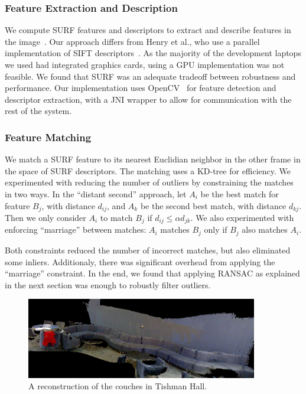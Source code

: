 \documentclass[letterpaper, 10pt, conference]{ieeeconf}
\begin{document}
\subsubsection{Feature Extraction and Description}
We compute SURF features and descriptors
to extract and describe features in the image~\cite{Bay06surf}. Our approach differs
from Henry et al., who use a parallel implementation of SIFT descriptors~\cite{SIFTGPU}.
As the majority of the development laptops we used had integrated graphics cards, using
a GPU implementation was not feasible. We found that SURF was an adequate tradeoff
between robustness and performance. Our implementation uses OpenCV~\cite{opencv_library}
for feature detection and descriptor extraction, with a JNI wrapper to allow for
communication with the rest of the system.

\subsubsection{Feature Matching}
We match a SURF feature to its nearest Euclidian neighbor in the other frame in the space
of SURF descriptors. The matching
uses a KD-tree for efficiency. We experimented with reducing the number of outliers by
constraining the matches in two ways. In the ``distant second'' approach, let $A_i$ be the
best match for feature $B_j$, with distance $d_{ij}$, and $A_k$ be the second best match,
with distance $d_{kj}$. Then we only consider $A_i$ to match $B_j$ if $d_{ij} \le \alpha d_{jk}$.
We also experimented with enforcing ``marriage'' between matches: $A_i$ matches $B_j$ only if
$B_j$ also matches $A_i$.

Both constraints reduced the number of incorrect matches, but also eliminated some inliers.
Additionaly, there was significant overhead from applying the ``marriage'' constraint.
In the end, we found that applying RANSAC as explained in the next section was enough
to robustly filter outliers.

\begin{figure}[t]
\centering
\includegraphics[width=0.9\textwidth]{figures/awesome_couch.png}
\caption{A reconstruction of the couches in Tishman Hall.}
\label{fig:couch}
\end{figure}
\end{document}
